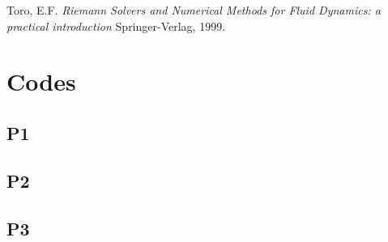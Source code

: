 \documentclass[a4paper,11pt]{article}
\begin{document}
\begin{thebibliography}{9}
Toro, E.F.
\textit{Riemann Solvers and Numerical Methods for Fluid Dynamics: a practical introduction} 
Springer-Verlag, 1999.
\end{thebibliography}
\newpage
\appendix
\section{Codes}
\subsection{P1}
\label{P1}

\subsection{P2}
\label{P2}

\subsection{P3}
\label{P3}

\end{document}
